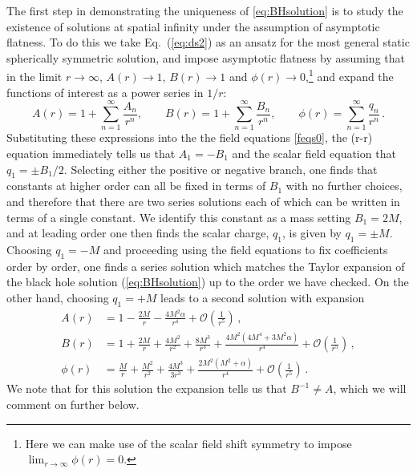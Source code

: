 \documentclass[reprint,amsmath,amssymbGaps,onecolumn,notitlepage,nofootinbib]{revtex4-1}
\begin{document}
The first step in demonstrating the uniqueness of \eqref{eq:BHsolution} is to study the existence of solutions at spatial infinity under the assumption of asymptotic flatness. To do this we take Eq.~(\ref{eq:ds2}) as an ansatz for the most general static spherically symmetric solution, and impose asymptotic flatness by assuming that in the limit $r \to \infty$,  $A(r) \to 1$, $B(r) \to 1$ and $\phi(r) \to 0$,\footnote{Here we can make use of the scalar field shift symmetry to impose $\lim_{r \to \infty}\phi(r) = 0$.} and expand the functions of interest as a power series in $1/r$:
\begin{equation}
A(r) = 1+\sum_{n=1}^{\infty} \frac{A_{n}}{r^{n}}, \qquad B(r) = 1+\sum_{n=1}^{\infty} \frac{B_{n}}{r^{n}}, \qquad  \phi(r)=\sum_{n=1}^{\infty} \frac{q_{n}}{r^{n}}\,.
\label{eq:series}
\end{equation} 
Substituting these expressions into the the field equations \eqref{feqs0}, the (r-r) equation 
immediately tells us that $A_1=-B_1$ and the scalar field equation that $q_1=\pm B_1/2$.  
Selecting either the positive or negative branch, one finds that constants at higher order can all be fixed in 
terms of $B_1$ with no further choices, and therefore that there are two series 
solutions each of which can be written in terms 
of a single constant. We identify this constant as a mass setting $B_1 = 2 M$, 
and  at leading order one then finds the scalar charge, $q_1$, is given by
$q_1=\pm M$. Choosing $q_1=-M$ and proceeding using the field equations to fix 
coefficients order by order, one finds a series solution which matches
the Taylor expansion of the black hole solution (\ref{eq:BHsolution}) up to the order we have checked. 
On the other hand, choosing $q_1=+M$ leads to a second solution with expansion 
\begin{align}
A(r) &= 1-\frac{2M}{r}-\frac{4M^2\alpha}{r^4} + \mathcal{O}\left( \frac{1}{r^5}\right)\,,\nonumber \\ 
B(r) &= 1+\frac{2M}{r}+\frac{4M^2}{r^2} + \frac{8 M^3}{r^3}+ \frac{4 M^2(4 M^4+3 M^2 \alpha)}{r^4} +\mathcal{O}\left( \frac{1}{r^5}\right)\,, \nonumber\\ 
 \phi(r) &= \frac{M}{r} + \frac{M^2}{r^2} + \frac{4M^3}{3r^3} + \frac{2M^2(M^2+\alpha)}{r^4}  + \mathcal{O}\left( \frac{1}{r^5}\right)\,.
\label{eq:asympt}
\end{align}
We note that for this solution the expansion tells us that $B^{-1} \neq A$, which we will comment on further below.  
\end{document}
